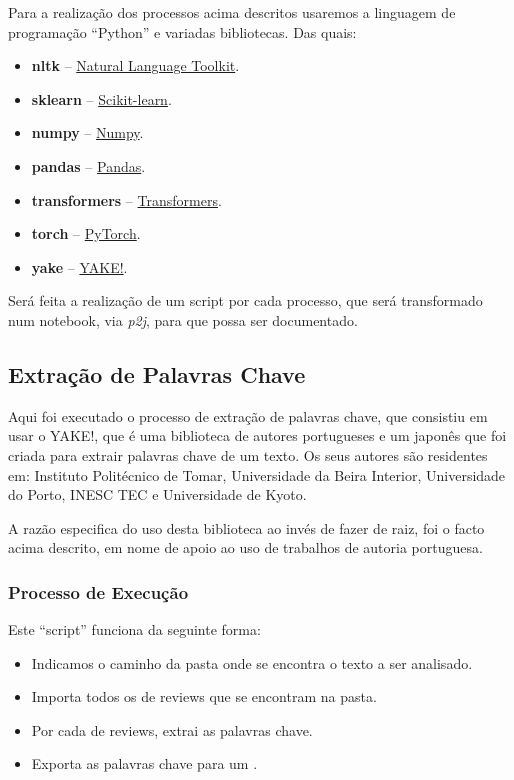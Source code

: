 \documentclass[a4paper,10pt]{article}
\begin{document}
Para a realização dos processos acima descritos usaremos a linguagem de programação ``Python'' e variadas bibliotecas.
Das quais:

\begin{itemize}
  \item \textbf{nltk} -- \href{https://pypi.org/project/nltk/}{Natural Language Toolkit}.
  \item \textbf{sklearn} -- \href{https://pypi.org/project/scikit-learn/}{Scikit-learn}.
  \item \textbf{numpy} -- \href{https://pypi.org/project/numpy/}{Numpy}.
  \item \textbf{pandas} -- \href{https://pypi.org/project/pandas/}{Pandas}.
  \item \textbf{transformers} -- \href{https://pypi.org/project/transformers/}{Transformers}.
  \item \textbf{torch} -- \href{https://pypi.org/project/torch/}{PyTorch}.
  \item \textbf{yake} -- \href{https://pypi.org/project/yake/}{YAKE!}.
\end{itemize}

Será feita a realização de um script por cada processo, que será transformado num notebook, via \textit{p2j}, para que possa ser documentado.

\subsection{Extração de Palavras Chave}

Aqui foi executado o processo de extração de palavras chave, que consistiu em usar o YAKE!, que é uma biblioteca de autores portugueses e um japonês que foi criada para extrair palavras chave de um texto. Os seus autores são residentes em: Instituto Politécnico de Tomar, Universidade da Beira Interior, Universidade do Porto, INESC TEC e Universidade de Kyoto.

A razão especifica do uso desta biblioteca ao invés de fazer de raiz, foi o facto acima descrito, em nome de apoio ao uso de trabalhos de autoria portuguesa.

\subsubsection{Processo de Execução}

Este ``script'' funciona da seguinte forma:

\begin{itemize}
  \item Indicamos o caminho da pasta onde se encontra o texto a ser analisado.
  \item Importa todos os  de reviews que se encontram na pasta.
  \item Por cada  de reviews, extrai as palavras chave.
  \item Exporta as palavras chave para um .
\end{itemize}
\end{document}
